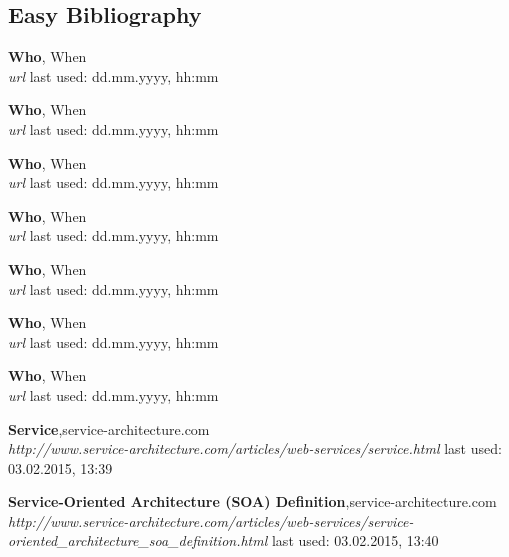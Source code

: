 \documentclass[12pt]{article}
\begin{document}
\subsection{Easy Bibliography}
\begin{thebibliography}{56}

   \textbf{Who}, When\\
  \textit{url}
  \newline last used: dd.mm.yyyy, hh:mm


   \textbf{Who}, When\\
  \textit{url}
  \newline last used: dd.mm.yyyy, hh:mm
 
 
   \textbf{Who}, When\\
  \textit{url}
  \newline last used: dd.mm.yyyy, hh:mm
 
 
   \textbf{Who}, When\\
  \textit{url}
  \newline last used: dd.mm.yyyy, hh:mm
 
  
   \textbf{Who}, When\\
  \textit{url}
  \newline last used: dd.mm.yyyy, hh:mm
    
 
   \textbf{Who}, When\\
  \textit{url}
  \newline last used: dd.mm.yyyy, hh:mm
  
 
   \textbf{Who}, When\\
  \textit{url}
  \newline last used: dd.mm.yyyy, hh:mm
    
  
   
 
   \textbf{Service},service-architecture.com \\
  \textit{http://www.service-architecture.com/articles/web-services/service.html}
  \newline last used: 03.02.2015, 13:39
     
     
   \textbf{Service-Oriented Architecture (SOA) Definition},service-architecture.com \\
  \textit{http://www.service-architecture.com/articles/web-services/service-oriented\_architecture\_soa\_definition.html}
  \newline last used: 03.02.2015, 13:40
     

\end{thebibliography}
\end{document}
